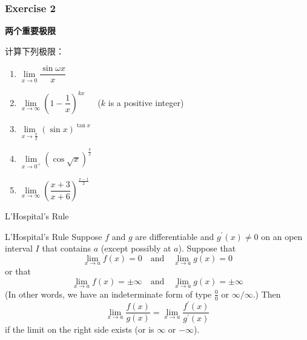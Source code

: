 \begin{frame}
	\frametitle{Exercise 2}
	\textbf{\alert{两个重要极限}}

	\vspace*{1em}

	计算下列极限：
	\begin{enumerate}
		\item $\lim\limits_{\textit{x} \to 0}\dfrac{\sin{\omega x}}{x}$
		\item $\lim\limits_{\textit{x} \to \infty}(1-\dfrac{1}{x})^{kx}$\ \ \ ($k$ is a positive integer)
		\item $\lim\limits_{\textit{x} \to \frac{\pi}{2}}(\sin{x})^{\tan{x}}$
		\item $\lim \limits_{x \to 0^{+}} (\cos \sqrt{x})^{\frac{\pi}{x}}$
		\item $\lim \limits_{x \to \infty}\left(\dfrac{x+3}{x+6}\right)^{\frac{x-1}{2}}$
	\end{enumerate}
	\vspace*{1em}
\end{frame}







\begin{frame}{L'Hospital's Rule}
	\begin{block}{L'Hospital's Rule}
		Suppose $f$ and $g$ are differentiable and $g^\prime(x)\neq0$ on an open interval $I$ that contains $a$ (except possibly at $a$). Suppose that\\
		$$
			\lim_{x\rightarrow a}f(x)=0\quad \text{and}\quad \lim_{x\rightarrow a}g(x)=0
		$$
		or that
		$$
			\lim_{x\rightarrow a}f(x)=\pm\infty\quad \text{and}\quad \lim_{x\rightarrow a}g(x)=\pm\infty
		$$
		(In other words, we have an indeterminate form of type $\frac{0}{0}$ or $\infty/\infty$.) Then\\
		$$
			\lim_{x\rightarrow a}\frac{f(x)}{g(x)}=\lim_{x\rightarrow a}\frac{f^\prime(x)}{g^\prime(x)}
		$$
		if the limit on the right side exists (or is $\infty$ or $-\infty$).
	\end{block}
\end{frame}






